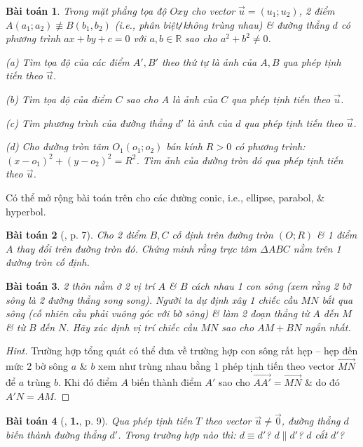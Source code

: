 \documentclass{article}
\numberwithin{equation}{section}
\newtheorem{baitoan}{Bài toán}[section]
\begin{document}
\begin{baitoan}
	Trong mặt phẳng tọa độ $Oxy$ cho vector $\vec{u} = (u_1;u_2)$, 2 điểm $A(a_1;a_2)\not\equiv B(b_1,b_2)$ (i.e., phân biệt\emph{\texttt{/}}không trùng nhau) \& đường thẳng $d$ có phương trình $ax + by + c = 0$ với $a,b\in\mathbb{R}$ sao cho $a^2 + b^2\ne 0$.
	\begin{enumerate*}
		\item[(a)] Tìm tọa độ của các điểm $A',B'$ theo thứ tự là ảnh của $A,B$ qua phép tịnh tiến theo $\vec{u}$.
		\item[(b)] Tìm tọa độ của điểm $C$ sao cho $A$ là ảnh của $C$ qua phép tịnh tiến theo $\vec{u}$.
		\item[(c)] Tìm phương trình của đường thẳng $d'$  là ảnh của $d$ qua phép tịnh tiến theo $\vec{u}$.
		\item[(d)] Cho đường tròn tâm $O_1(o_1;o_2)$ bán kính $R > 0$ có phương trình: $(x - o_1)^2 + (y - o_2)^2 = R^2$. Tìm ảnh của đường tròn đó qua phép tịnh tiến theo $\vec{u}$.
	\end{enumerate*}
\end{baitoan}
Có thể mở rộng bài toán trên cho các đường conic, i.e., ellipse, parabol, \& hyperbol.

\begin{baitoan}[\cite{SGK_Toan_11_hinh_hoc_nang_cao}, p. 7]
	Cho 2 điểm $B,C$ cố định trên đường tròn $(O;R)$ \& 1 điểm $A$ thay đổi trên đường tròn đó. Chứng minh rằng trực tâm $\Delta ABC$ nằm trên 1 đường tròn cố định.
\end{baitoan}

\begin{baitoan}
	2 thôn nằm ở 2 vị trí $A$ \& $B$ cách nhau 1 con sông (xem rằng 2 bờ sông là 2 đường thẳng song song). Người ta dự định xây 1 chiếc cầu $MN$ bắt qua sông (cố nhiên cầu phải vuông góc với bờ sông) \& làm 2 đoạn thẳng từ $A$ đến $M$ \& từ $B$ đến $N$. Hãy xác định vị trí chiếc cầu $MN$ sao cho $AM + BN$ ngắn nhất.
\end{baitoan}

\begin{proof}[Hint]
	Trường hợp tổng quát có thể đưa về trường hợp con sông rất hẹp -- hẹp đến mức 2 bờ sông $a$ \& $b$ xem như trùng nhau bằng 1 phép tịnh tiến theo vector $\overrightarrow{MN}$ để $a$ trùng $b$. Khi đó điểm $A$ biến thành điểm $A'$ sao cho $\overrightarrow{AA'} = \overrightarrow{MN}$ \& do đó $A'N = AM$.
\end{proof}

\begin{baitoan}[\cite{SGK_Toan_11_hinh_hoc_nang_cao}, \textbf{1.}, p. 9]
	Qua phép tịnh tiến $T$ theo vector $\vec{u}\ne\vec{0}$, đường thẳng $d$ biến thành đường thẳng $d'$. Trong trường hợp nào thì: $d\equiv d'$? $d\parallel d'$? $d$ cắt $d'$? 
\end{baitoan}
\end{document}
